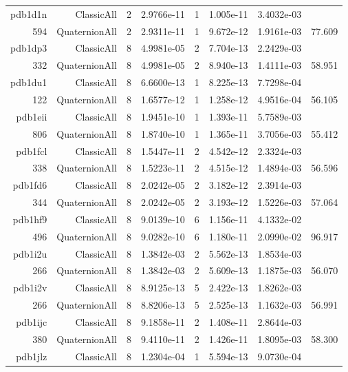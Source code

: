\begin{xltabular}{\textwidth}{r|rcS[table-format=1.4e+2]cS[table-format=1.3e+2]S[table-format=1.4e+2]S[table-format=-1.3]}
pdb1d1n & ClassicAll & 2 & 2.9766e-11 & 1 & 1.005e-11 & 3.4032e-03 & \\
594 & QuaternionAll & 2 & 2.9311e-11 & 1 & 9.672e-12 & 1.9161e-03 & 77.609\\  \addlinespace
pdb1dp3 & ClassicAll & 8 & 4.9981e-05 & 2 & 7.704e-13 & 2.2429e-03 & \\
332 & QuaternionAll & 8 & 4.9981e-05 & 2 & 8.940e-13 & 1.4111e-03 & 58.951\\  \addlinespace
pdb1du1 & ClassicAll & 8 & 6.6600e-13 & 1 & 8.225e-13 & 7.7298e-04 & \\
122 & QuaternionAll & 8 & 1.6577e-12 & 1 & 1.258e-12 & 4.9516e-04 & 56.105\\  \addlinespace
pdb1eii & ClassicAll & 8 & 1.9451e-10 & 1 & 1.393e-11 & 5.7589e-03 & \\
806 & QuaternionAll & 8 & 1.8740e-10 & 1 & 1.365e-11 & 3.7056e-03 & 55.412\\  \addlinespace
pdb1fcl & ClassicAll & 8 & 1.5447e-11 & 2 & 4.542e-12 & 2.3324e-03 & \\
338 & QuaternionAll & 8 & 1.5223e-11 & 2 & 4.515e-12 & 1.4894e-03 & 56.596\\  \addlinespace
pdb1fd6 & ClassicAll & 8 & 2.0242e-05 & 2 & 3.182e-12 & 2.3914e-03 & \\
344 & QuaternionAll & 8 & 2.0242e-05 & 2 & 3.193e-12 & 1.5226e-03 & 57.064\\  \addlinespace
pdb1hf9 & ClassicAll & 8 & 9.0139e-10 & 6 & 1.156e-11 & 4.1332e-02 & \\
496 & QuaternionAll & 8 & 9.0282e-10 & 6 & 1.180e-11 & 2.0990e-02 & 96.917\\  \addlinespace
pdb1i2u & ClassicAll & 8 & 1.3842e-03 & 2 & 5.562e-13 & 1.8534e-03 & \\
266 & QuaternionAll & 8 & 1.3842e-03 & 2 & 5.609e-13 & 1.1875e-03 & 56.070\\  \addlinespace
pdb1i2v & ClassicAll & 8 & 8.9125e-13 & 5 & 2.422e-13 & 1.8262e-03 & \\
266 & QuaternionAll & 8 & 8.8206e-13 & 5 & 2.525e-13 & 1.1632e-03 & 56.991\\  \addlinespace
pdb1ijc & ClassicAll & 8 & 9.1858e-11 & 2 & 1.408e-11 & 2.8644e-03 & \\
380 & QuaternionAll & 8 & 9.4110e-11 & 2 & 1.426e-11 & 1.8095e-03 & 58.300\\  \addlinespace
pdb1jlz & ClassicAll & 8 & 1.2304e-04 & 1 & 5.594e-13 & 9.0730e-04 & \\

\end{xltabular}
